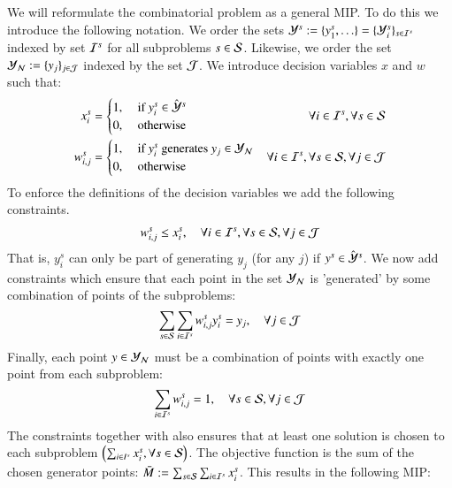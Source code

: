 \begin{enumerate}
We will reformulate the combinatorial problem as a general MIP. To do this we introduce the following notation. We order the sets $\Y^s := \{y^s_1,\hdots\} = \{\Y_i^s\}_{s \in \I^s}$ indexed by set $\I^s$ for all subproblems $ s \in \S$. Likewise, we order the set $\Yn := \{y_j\}_{j \in \J}$ indexed by the set $\J$. We introduce decision variables $x$ and $w$ such that:
\begin{align}
	x^s_i &= \begin{cases}
    	1, &\text{ if }y_i^s \in \hY^s \\ 
    	0, &\text{ otherwise }\\ 
    \end{cases}
    & \forall i \in \I^s, \forall s \in \S
    \\
		w^s_{i,j} &= \begin{cases}
    	1, &\text{ if $y^s_i$ generates $y_j \in \Yn$} \\ 
    	0, &\text{ otherwise }\\ 
    \end{cases}
    & \forall i \in \I^s, \forall s \in \S, \forall j \in \J \nonumber
\end{align}
To enforce the definitions of the decision variables we add the following constraints.
\begin{align}
    w^s_{i,j} \le x^s_i, \quad \forall i \in \I^s, \forall s \in \S, \forall j \in \J \label{constr:MIP-subset-chosen}
\end{align}
That is, $y^s_i$ can only be part of generating $y_j$ (for any $j$) if $y^s \in \hY^s$. We now add constraints which ensure that each point in the set $\Yn$ is 'generated' by some combination of points of the subproblems:
\begin{align}
    \sum_{s \in \S}\sum_{i \in \I^s} w^s_{i,j} y^s_i = y_j, \quad \forall j \in \J \label{constr:MIP-generating}
\end{align}
Finally, each point $y \in \Yn$ must be a combination of points with exactly one point from each subproblem:
\begin{align}
    \sum_{i \in \I^s} w^s_{i,j} = 1, \quad \forall s \in \S, \forall j \in \J \label{constr:MIP-combination-single}
\end{align}
The constraints  together with  also ensures that at least one solution is chosen to each subproblem $\left( \sum_{i \in I^s} x^s_i,  \forall s \in \S \right)$.
The objective function is the sum of the chosen generator points: $\bar{M} := \sum_{s \in \S}\sum_{i \in \I^s} x^s_i$. This results in the following MIP:


\end{enumerate}
